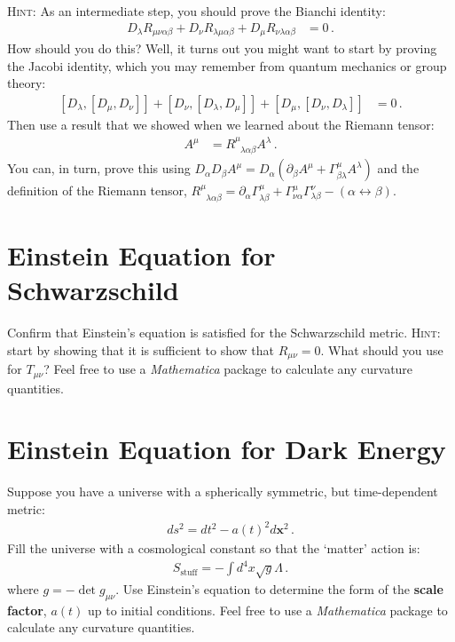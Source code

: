 \documentclass[12pt]{article}
\numberwithin{equation}{section}    %
\renewcommand{\vec}[1]{\mathbf{#1}} %
\begin{document}
\textsc{Hint}: As an intermediate step, you should prove the Bianchi identity:
\begin{align}
	D_\lambda R_{\mu\nu\alpha\beta}
	+ D_\nu R_{\lambda\mu\alpha\beta}
	+ D_\mu R_{\nu\lambda\alpha\beta}
	& = 0\, .
\end{align}
How should you do this? Well, it turns out you might want to start by proving the Jacobi identity, which you may remember from quantum mechanics or group theory:
\begin{align}
	\left[D_\lambda,[D_\mu,D_\nu]\right]
	+
	\left[D_\nu,[D_\lambda,D_\mu]\right]
	+
	\left[D_\mu,[D_\nu,D_\lambda]\right]
	&= 0 \, .
\end{align}
Then use a result that we showed when we learned about the Riemann tensor:
\begin{align}
	[D_\alpha,D_\beta] A^\mu &= R^\mu_{\phantom\mu \lambda \alpha \beta} A^\lambda  \, .
\end{align}
You can, in turn, prove this using $D_\alpha D_\beta A^\mu = D_\alpha(\partial_\beta A^\mu + \Gamma^\mu_{\beta\lambda} A^\lambda)$ and the definition of the Riemann tensor, $R^\mu_{\phantom\mu \lambda\alpha\beta} = \partial_\alpha \Gamma^\mu_{\lambda\beta} + \Gamma^\mu_{\nu\alpha}\Gamma^{\nu}_{\lambda\beta} - (\alpha\leftrightarrow\beta)$.



\section{Einstein Equation for Schwarzschild}

Confirm that Einstein's equation is satisfied for the Schwarzschild metric. \textsc{Hint}: start by showing that it is sufficient to show that $R_{\mu\nu} = 0$. What should you use for $T_{\mu\nu}$? Feel free to use a \textit{Mathematica} package to calculate any curvature quantities.


\section{Einstein Equation for Dark Energy}

Suppose you have a universe with a spherically symmetric, but time-dependent metric:
\begin{align}
	ds^2 = dt^2 - a(t)^2 d\vec x^2 \, .
\end{align}
Fill the universe with a cosmological constant so that the `matter' action is:
\begin{align}
	S_\text{stuff} = -\int d^4x \sqrt{g} \Lambda \, .
\end{align}
where $g = -\det g_{\mu\nu}$. Use Einstein's equation to determine the form of the \textbf{scale factor}, $a(t)$ up to initial conditions. Feel free to use a \textit{Mathematica} package to calculate any curvature quantities.
\end{document}
